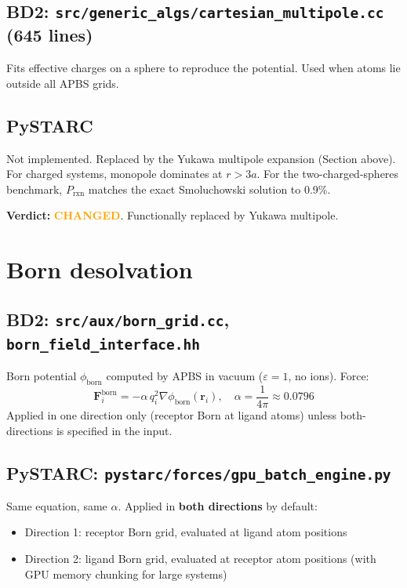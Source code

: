 \documentclass[11pt]{article}
\newcommand{\changed}{\textcolor{Orange}{\textbf{CHANGED}}}
\begin{document}
\subsection{BD2: \texttt{src/generic\_algs/cartesian\_multipole.cc} (645 lines)}
Fits effective charges on a sphere to reproduce the potential.
Used when atoms lie outside all APBS grids.

\subsection{PySTARC}
Not implemented. Replaced by the Yukawa multipole expansion (Section above).
For charged systems, monopole dominates at $r > 3a$.
For the two-charged-spheres benchmark, $P_\mathrm{rxn}$ matches
the exact Smoluchowski solution to 0.9\%.

\textbf{Verdict:} \changed. Functionally replaced by Yukawa multipole.


\section{Born desolvation}

\subsection{BD2: \texttt{src/aux/born\_grid.cc}, \texttt{born\_field\_interface.hh}}
Born potential $\phi_\mathrm{born}$ computed by APBS in vacuum
($\varepsilon = 1$, no ions). Force:
\begin{equation}
\mathbf{F}_i^\mathrm{born} = -\alpha\, q_i^2 \nabla\phi_\mathrm{born}(\mathbf{r}_i),
\quad \alpha = \frac{1}{4\pi} \approx 0.0796
\end{equation}
Applied in one direction only (receptor Born at ligand atoms) unless
both-directions is specified in the input.

\subsection{PySTARC: \texttt{pystarc/forces/gpu\_batch\_engine.py}}
Same equation, same $\alpha$. Applied in \textbf{both directions} by default:
\begin{itemize}
\item Direction 1: receptor Born grid, evaluated at ligand atom positions
\item Direction 2: ligand Born grid, evaluated at receptor atom positions
  (with GPU memory chunking for large systems)
\end{itemize}
\end{document}

